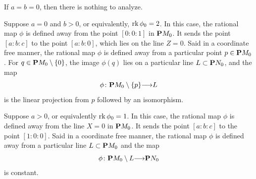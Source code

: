 \documentclass[11pt,reqno, letterpaper]{amsart}
\renewcommand{\to}{{\longrightarrow}}
\numberwithin{equation}{section}
\begin{document}
If $a = b = 0$, then there is nothing to analyze.

Suppose $a = 0$ and $b > 0$, or equivalently, $\rk \phi_0 = 2$.
In this case, the rational map $\phi$ is defined away from the point $[0:0:1]$ in $\P M_0$.
It sends the point $[a:b:c]$ to the point $[a:b:0]$, which lies on the line $Z = 0$.
Said in a coordinate free manner, the rational map $\phi$ is defined away from a particular point $p \in \P M_0$.
For $q \in \P M_0 \setminus \{0\}$, the image $\phi(q)$ lies on a particular line $L \subset \P N_0$, and the map
\begin{equation}\label{eqn:rk2}
  \phi \colon \P M_0 \setminus \{p\} \to L
\end{equation}
is the linear projection from $p$ followed by an isomorphism.

Suppose $a > 0$, or equivalently $\rk \phi_0 = 1$.
In this case, the rational map $\phi$ is defined away from the line $X = 0$ in $\P M_0$.
It sends the point $[a:b:c]$ to the point $[1:0:0]$.
Said in a coordinate free manner, the rational map $\phi$ is defined away from a particular line $L \subset \P M_0$ and the map
\begin{equation}\label{eqn:rk1}
  \phi \colon \P M_0 \setminus L \to \P N_0
\end{equation}
is constant.
\end{document}

